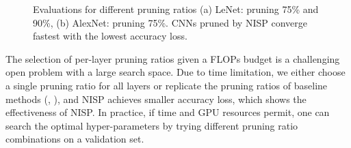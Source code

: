 \documentclass[10pt,twocolumn,letterpaper]{article}
\begin{document}
\begin{figure}
\centering     %
{}

\caption{Evaluations for different pruning ratios (a) LeNet: pruning 75\% and 90\%, (b) AlexNet: pruning 75\%.  
CNNs pruned by NISP converge fastest with the lowest accuracy loss.}
\label{SuperALl}
\end{figure}%
The selection of per-layer pruning ratios given a FLOPs budget is a challenging open problem with a large search space. Due to time limitation, we either choose a single pruning ratio for all layers or replicate the pruning ratios of baseline methods (\eg, \cite{Tucker}), and NISP achieves smaller accuracy loss, which shows the effectiveness of NISP. In practice, if time and GPU resources permit, one can search the optimal hyper-parameters by trying different pruning ratio combinations on a validation set.
\end{document}
